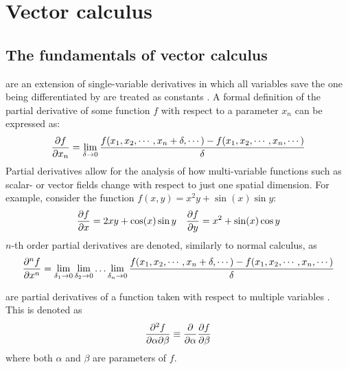 \section{Vector calculus}
\subsection{The fundamentals of vector calculus}

\begin{defn}
	 are an extension of single-variable derivatives in which all variables save
	the one being differentiated by are treated as constants \cite{MORTIMER201389}. A formal definition of the
	partial derivative of some function $f$ with respect to a parameter $x_n$ can be expressed as:
	\begin{equation}
		\pdv{f}{x_n}=\lim_{\delta\rightarrow0}\frac{f(x_1,x_2,\cdots,x_n+\delta,\cdots)-f(x_1,x_2,\cdots,x_n,\cdots)}{\delta}
	\end{equation}
	Partial derivatives allow for the analysis of how multi-variable functions such as scalar- or vector fields change
	with respect to just one spatial dimension. For example, consider the function $f(x,y)=x^2y+\sin(x)\sin y$:
	\begin{align*}
		\pdv{f}{x}=2xy+\cos(x)\sin y&&\pdv{f}{y}=x^2+\sin(x)\cos y
	\end{align*}
	$n$-th order partial derivatives are denoted, similarly to normal calculus, as
	$$
	\pdv[n]{f}{x}=\lim_{\delta_1\rightarrow0}\lim_{\delta_2\rightarrow0}\hdots\lim_{\delta_n\rightarrow0}\frac{f(x_1,x_2,\cdots,x_n+\delta,\cdots)-f(x_1,x_2,\cdots,x_n,\cdots)}{\delta}
	$$
\end{defn}
\begin{defn}
	 are partial derivatives of a function taken with respect to multiple
	variables \cite{GARRETT2015377}. This is denoted as
	$$
	\pdv{f}{\alpha}{\beta}\equiv\pdv{\alpha}\pdv{f}{\beta}
	$$
	where both $\alpha$ and $\beta$ are parameters of $f$.
\end{defn}
